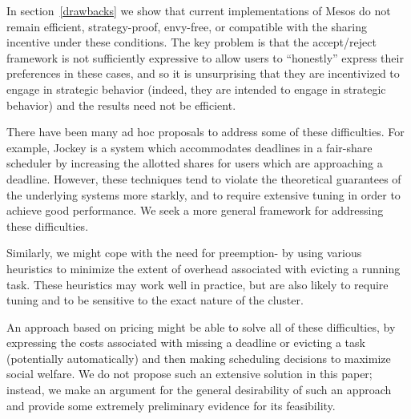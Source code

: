\documentclass{acm_proc_article-sp}
\begin{document}
In section~\ref{drawbacks} we show that current implementations
of Mesos do not remain efficient, strategy-proof, envy-free,
or compatible with the sharing incentive under these conditions.
The key problem is that the accept/reject framework is not sufficiently expressive
to allow users to ``honestly'' express their preferences in these cases,
and so it is unsurprising that they are incentivized to engage
in strategic behavior (indeed, they are intended to engage in strategic behavior)
and the results need not be efficient.

There have been many ad hoc proposals to address some of these difficulties.
For example, Jockey is a system which accommodates deadlines in a fair-share
scheduler by increasing the allotted shares for users which are approaching
a deadline.
However, these techniques tend to violate the theoretical guarantees
of the underlying systems more starkly, and to require extensive tuning
in order to achieve good performance.
We seek a more general framework for addressing these difficulties.

Similarly, we might cope with the need for preemption-  by using various
heuristics to minimize the extent of overhead associated with evicting a running
task.
These heuristics may work well in practice, but are also likely to require
tuning and to be sensitive to the exact nature of the cluster.

An approach based on pricing might be able to solve all of these difficulties,
by expressing the costs associated with missing a deadline or evicting a task 
(potentially automatically) and then making scheduling decisions to maximize
social welfare.
We do not propose such an extensive solution in this paper; instead,
we make an argument for the general desirability of such an approach and provide
some extremely preliminary evidence for its feasibility.
\end{document}
